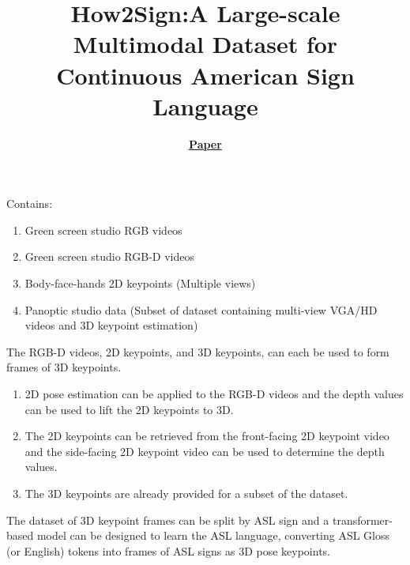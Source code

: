 \documentclass{article}
\title{How2Sign:\@ A Large-scale Multimodal Dataset for Continuous American Sign Language}
\author{\textbf{\href{https://arxiv.org/pdf/2008.08143}{Paper}}}
\date{}
\begin{document}
\maketitle

Contains:
\begin{enumerate}
    \item Green screen studio RGB videos
    \item Green screen studio RGB-D videos
    \item Body-face-hands 2D keypoints (Multiple views)
    \item Panoptic studio data (Subset of dataset containing multi-view VGA/HD videos and 3D keypoint estimation)
\end{enumerate}

The RGB-D videos, 2D keypoints, and 3D keypoints, can each be used to form frames of 3D keypoints.
\begin{enumerate}
    \item 2D pose estimation can be applied to the RGB-D videos and the depth values can be used to lift the 2D keypoints to 3D.
    \item The 2D keypoints can be retrieved from the front-facing 2D keypoint video and the side-facing 2D keypoint video can be used to determine the depth values.
    \item The 3D keypoints are already provided for a subset of the dataset.
\end{enumerate}

The dataset of 3D keypoint frames can be split by ASL sign and a transformer-based model can be designed to learn the ASL language, converting ASL Gloss (or English) tokens into frames of ASL signs as 3D pose keypoints.
\end{document}
